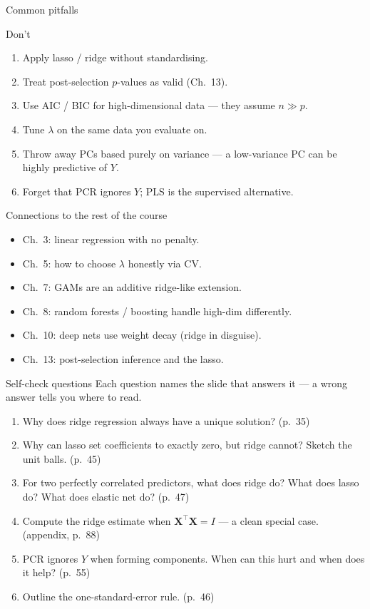 \documentclass[aspectratio=169,11pt]{beamer}
\begin{document}
\begin{frame}{Common pitfalls}
  \begin{alertblock}{Don't}
    \begin{enumerate}
      \item Apply lasso / ridge without standardising.
      \item Treat post-selection $p$-values as valid (Ch.~13).
      \item Use AIC / BIC for high-dimensional data --- they assume
            $n \gg p$.
      \item Tune $\lambda$ on the same data you evaluate on.
      \item Throw away PCs based purely on variance --- a low-variance
            PC can be highly predictive of $Y$.
      \item Forget that PCR ignores $Y$; PLS is the supervised
            alternative.
    \end{enumerate}
  \end{alertblock}
\end{frame}

\begin{frame}{Connections to the rest of the course}
  \begin{itemize}
    \item Ch.~3: linear regression with no penalty.
    \item Ch.~5: how to choose $\lambda$ honestly via CV.
    \item Ch.~7: GAMs are an additive ridge-like extension.
    \item Ch.~8: random forests / boosting handle high-dim differently.
    \item Ch.~10: deep nets use weight decay (ridge in disguise).
    \item Ch.~13: post-selection inference and the lasso.
  \end{itemize}
\end{frame}

\begin{frame}{Self-check questions}
  Each question names the slide that answers it --- a wrong answer tells you
  where to read.
  \begin{enumerate}
    \item Why does ridge regression always have a unique solution?
          (p.~35)
    \item Why can lasso set coefficients to exactly zero, but ridge
          cannot? Sketch the unit balls. (p.~45)
    \item For two perfectly correlated predictors, what does ridge do?
          What does lasso do? What does elastic net do? (p.~47)
    \item Compute the ridge estimate when $\mathbf{X}^\top\mathbf{X} = I$
          --- a clean special case. (appendix, p.~88)
    \item PCR ignores $Y$ when forming components. When can this hurt
          and when does it help? (p.~55)
    \item Outline the one-standard-error rule. (p.~46)
  \end{enumerate}
\end{frame}
\end{document}
